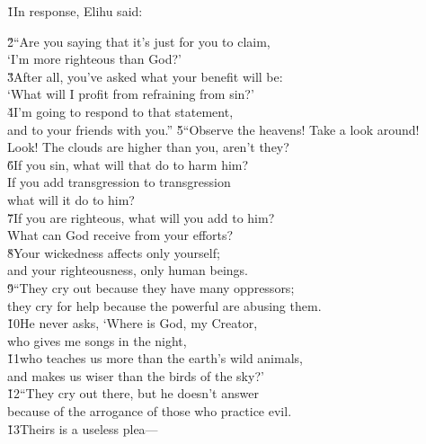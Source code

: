 \v{1}In response, Elihu said:

\begin{poetry}
\poeml \v{2}``Are you saying that it's just for you to claim, \\
\poemll    `I'm more righteous than God?' \\
\poeml \v{3}After all, you've asked what your benefit will be: \\
\poemll    `What will I profit from refraining from sin?' \\
\poeml \v{4}I'm going to respond to that statement, \\
\poemll    and to your friends with you.''
\poeml \v{5}``Observe the heavens! Take a look around! \\
\poemll    Look! The clouds are higher than you, aren't they? \\
\poeml \v{6}If you sin, what will that do to harm him? \\
\poemll    If you add transgression to transgression \\
\poemlll       what will it do to him? \\
\poeml \v{7}If you are righteous, what will you add to him? \\
\poemll    What can God receive from your efforts? \\
\poeml \v{8}Your wickedness affects only yourself; \\
\poemll    and your righteousness, only human beings. \\
\poeml \v{9}``They cry out because they have many oppressors; \\
\poemll    they cry for help because the powerful are abusing them. \\
\poeml \v{10}He never asks, `Where is God, my Creator, \\
\poemll    who gives me songs in the night, \\
\poeml \v{11}who teaches us more than the earth's wild animals, \\
\poemll    and makes us wiser than the birds of the sky?' \\
\poeml \v{12}``They cry out there, but he doesn't answer \\
\poemll    because of the arrogance of those who practice evil. \\
\poeml \v{13}Theirs is a useless plea--- \\

\end{poetry}
